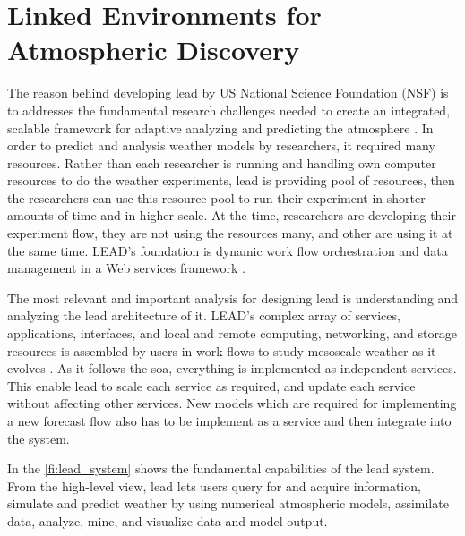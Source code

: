 \section{Linked Environments for Atmospheric Discovery}

The reason behind developing \acrfull{lead} by US National Science Foundation (NSF)  is to addresses the fundamental research challenges needed to create an integrated, scalable framework for adaptive analyzing and predicting the atmosphere \cite{Droegemeier2005Service-OrientedWeather}. In order to predict and analysis weather models by researchers, it required many resources. Rather than each researcher is running and handling own computer resources to do the weather experiments, \acrshort{lead} is providing pool of resources, then the researchers can use this resource pool to run their experiment in shorter amounts of time and in higher scale. At the time, researchers are developing their experiment flow, they are not using the resources many, and other are using it at the same time. LEAD’s foundation is dynamic work flow orchestration and data management in a Web services framework \cite{Droegemeier2005Service-OrientedWeather}.

The most relevant and important analysis for designing \acrshort{lead} is understanding and analyzing the \acrfull{lead} architecture of it. LEAD’s complex array of services, applications, interfaces, and local and remote computing, networking, and storage resources is assembled by users in work flows to study mesoscale weather as it evolves \cite{Droegemeier2005Service-OrientedWeather}. As it follows the \acrshort{soa}, everything is implemented as independent services. This enable \acrshort{lead} to scale each service as required, and update each service without affecting other services. New models which are required for implementing a new forecast flow also has to be implement as a service and then integrate into the system.

In the \ref{fi:lead_system} shows the fundamental capabilities of the \acrshort{lead} system. 
From the high-level view, \acrshort{lead} lets users query for and acquire information, simulate and predict weather by using numerical atmospheric models, assimilate data, analyze, mine, and visualize data and model output.

